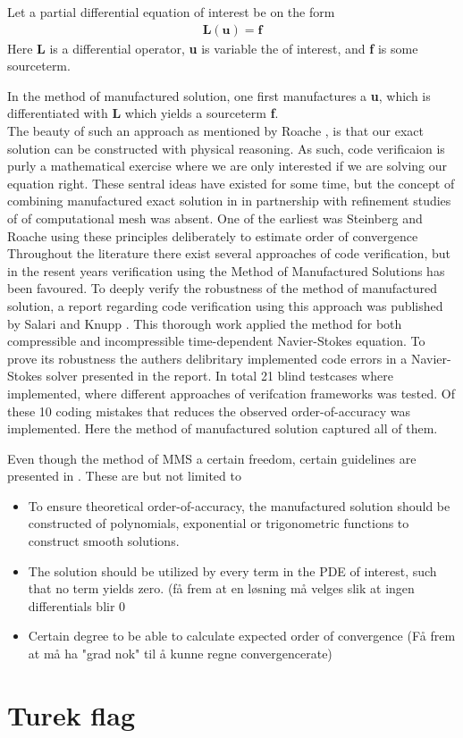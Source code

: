 Let a  partial differential equation of interest be on the form
\begin{align*}
\textbf{L}(\textbf{u}) = \textbf{f}
\end{align*}
\newpage
Here \textbf{L} is a differential operator, \textbf{u} is variable the of interest, and \textbf{f} is some sourceterm.

In the method of manufactured solution, one first manufactures a \textbf{u}, which is differentiated with \textbf{L} which yields a sourceterm  \textbf{f}. \\ The beauty of such an approach as mentioned by Roache \cite{Roache2002}, is that our exact solution can be constructed with physical reasoning. As such, code verificaion is purly a mathematical exercise where we are only interested if we are solving our equation right. These sentral ideas have existed for some time, but the  concept of combining manufactured exact solution in in partnership with refinement studies of of computational mesh was absent.  One of the earliest was Steinberg and Roache \cite{Steinberg1985} using these principles deliberately to estimate order of convergence\\

Throughout the literature there exist several approaches of code verification, but in the resent years verification using the Method of Manufactured Solutions has been favoured. 
To deeply verify the robustness of the method of manufactured solution,  a report regarding code verification using this approach was published by Salari and Knupp \cite{Biggs}. This thorough work applied the method for both compressible and incompressible time-dependent Navier-Stokes equation. To prove its robustness the authers  delibritary implemented  code errors in a Navier-Stokes solver presented in the report. In total 21 blind testcases where implemented, where different approaches of verifcation frameworks was tested. 
Of these 10 coding mistakes that reduces the observed order-of-accuracy was implemented. Here the method of manufactured solution captured all of them.

Even though the method of MMS a certain freedom, certain guidelines are presented in \cite{Biggs}. These are but not limited to

\begin{itemize}
\item To ensure theoretical order-of-accuracy, the manufactured solution should be constructed of polynomials, exponential or trigonometric functions to construct smooth solutions.
\item The solution should be utilized by every term in the PDE of interest, such that no term yields zero.
(få frem at en løsning må velges slik at ingen differentials blir 0
\item Certain degree to be able to calculate expected order of convergence (Få frem at må ha "grad nok" til å kunne regne convergencerate) 
\end{itemize}



                                                                                                                                                   
\section{Turek flag}